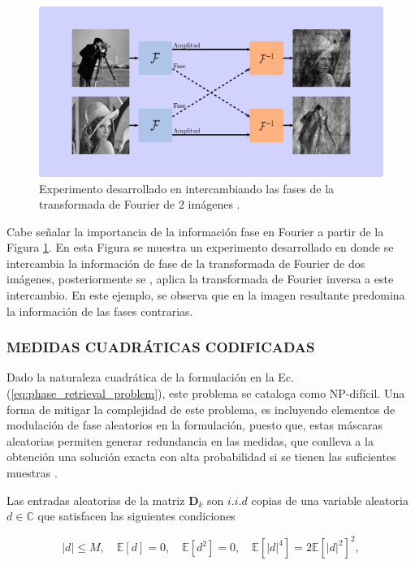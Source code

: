 \begin{figure}[H]
    \centering
    \includegraphics[width=0.8\linewidth]{images/mescla_abs_fase.pdf}
    \caption{\hspace{2mm}Experimento desarrollado en \cite{shechtman2015phase} intercambiando las fases de la transformada de Fourier de 2 imágenes .}
    \label{fig:mescla_fases}
\end{figure}

Cabe señalar la importancia de la información fase en Fourier a partir de la Figura \ref{fig:mescla_fases}. En esta Figura se muestra un experimento desarrollado en \cite{shechtman2015phase} donde se intercambia la información de fase de la transformada de Fourier de dos imágenes, posteriormente se , aplica la transformada de Fourier inversa a este intercambio. En este ejemplo, se observa que en la imagen resultante predomina la información de las fases contrarias.

\subsubsection{MEDIDAS CUADRÁTICAS CODIFICADAS}
Dado la naturaleza cuadrática de la formulación en la Ec. (\ref{eq:phase_retrieval_problem}), este problema se cataloga como NP-difícil. Una forma de mitigar la complejidad de este problema, es incluyendo elementos de modulación de fase aleatorios en la formulación, puesto que, estas máscaras aleatorias permiten generar redundancia en las medidas, que conlleva a la obtención una solución exacta con alta probabilidad si se tienen las suficientes muestras \cite{candes_CDP}.

Las entradas aleatorias de la matriz  $\mathbf{D}_k$ son $i.i.d$ copias de una variable aleatoria $d \in \mathbb{C}$ que satisfacen las siguientes condiciones

\begin{equation}
    \vert d \vert \leq M, \quad \mathbb{E}[d] = 0, \quad  \mathbb{E}[d^2] = 0, \quad  \mathbb{E}[\vert d \vert^4] = 2\mathbb{E}[\vert d \vert^2]^2,    
    \label{eq:restricciones_mascara}
\end{equation}

